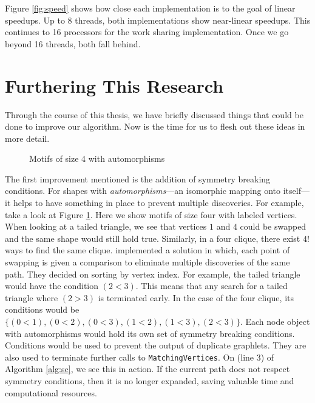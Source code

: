 \documentclass[12pt,twoside]{reedthesis}
\begin{document}
Figure \ref{fig:speed} shows how close each implementation is to the goal of linear speedups. Up to 8 threads, both implementations show near-linear speedups. This continues to 16 processors for the work sharing implementation. Once we go beyond 16 threads, both fall behind.

	\section{Furthering This Research}
	
Through the course of this thesis, we have briefly discussed things that could be done to improve our algorithm. Now is the time for us to flesh out these ideas in more detail.

\begin{figure}[h]
	\centering
	\caption{Motifs of size 4 with automorphisms}
	\label{fig:aut}
\end{figure}

The first improvement mentioned is the addition of symmetry breaking conditions. For shapes with \textit{automorphisms}---an isomorphic mapping onto itself---it helps to have something in place to prevent multiple discoveries. For example, take a look at Figure \ref{fig:aut}. Here we show motifs of size four with labeled vertices. When looking at a tailed triangle, we see that vertices $1$ and $4$ could be swapped and the same shape would still hold true. Similarly, in a four clique, there exist $4!$ ways to find the same clique. \citeauthor{g_tries} \cite{g_tries} implemented a solution in which, each point of swapping is given a comparison to eliminate multiple discoveries of the same path. They decided on sorting by vertex index. For example, the tailed triangle would have the condition $(2 < 3)$. This means that any search for a tailed triangle where $(2 > 3)$ is terminated early. In the case of the four clique, its conditions would be $\{(0<1), (0<2), (0<3), (1<2),(1<3), (2<3)\}$. Each node object with automorphisms would hold its own set of symmetry breaking conditions. Conditions would be used to prevent the output of duplicate graphlets. They are also used to terminate further calls to \texttt{MatchingVertices}. On (line 3) of Algorithm \ref{alg:sc}, we see this in action. If the current path does not respect symmetry conditions, then it is no longer expanded, saving valuable time and computational resources.
\end{document}
